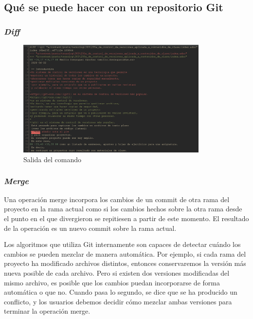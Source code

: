 \subsection{Qué se puede hacer con un repositorio Git}

\begin{frame}\frametitle{\textit{Diff}}
\begin{figure}[h]
    \centering
    \includegraphics[width=0.85\textwidth]{images/diff-example.png}
    \caption{Salida del comando }
\end{figure}

\href{https://github.com/alberto-ros/apuntes-aec/commit/8b114293d0a19697f0a8db69a6c8005bb6af8911}{}
\end{frame}

\begin{frame}\frametitle{\textit{Merge}}
Una operación merge incorpora los cambios
de un commit de otra rama del proyecto
en la rama actual
como si los cambios hechos sobre la otra rama desde el punto en el que divergieron
se repitiesen a partir de este momento.
El resultado de la operación es un nuevo commit sobre la rama actual.

Los algoritmos que utiliza Git internamente son capaces de detectar
cuándo los cambios se pueden mezclar de manera automática.
Por ejemplo, si cada rama del proyecto ha modificado archivos distintos,
entonces conservaremos la versión más nueva posible de cada archivo.
Pero si existen dos versiones modificadas del mismo archivo,
es posible que los cambios puedan incorporarse de forma automática o que no.
Cuando pasa lo segundo, se dice que se ha producido un conflicto,
y los usuarios debemos decidir cómo mezclar ambas versiones
para terminar la operación merge.
\end{frame}

